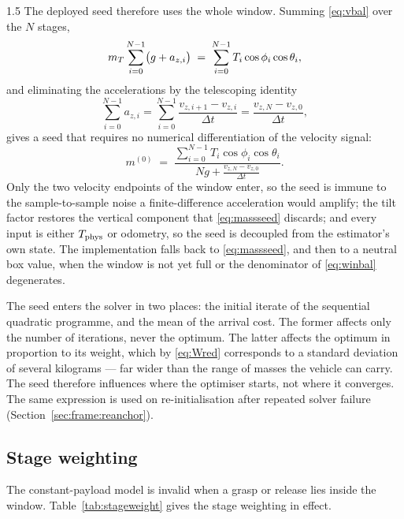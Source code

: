 \begin{spacing}{1.5}
The deployed seed therefore uses the whole window. Summing \eqref{eq:vbal} over
the $N$ stages,
\begin{equation}
m_T \sum_{i=0}^{N-1}\bigl(g + a_{z,i}\bigr) \;=\; \sum_{i=0}^{N-1} T_i \cos\phi_i\cos\theta_i ,
\label{eq:winbal1}
\end{equation}
and eliminating the accelerations by the telescoping identity
\begin{equation}
\sum_{i=0}^{N-1} a_{z,i}
= \sum_{i=0}^{N-1} \frac{v_{z,i+1}-v_{z,i}}{\Delta t}
= \frac{v_{z,N}-v_{z,0}}{\Delta t},
\label{eq:telescope}
\end{equation}
gives a seed that requires no numerical differentiation of the velocity signal:
\begin{equation}
m^{(0)} \;=\; \frac{\displaystyle\sum_{i=0}^{N-1} T_i \cos\phi_i\cos\theta_i}
                   {\displaystyle N g + \frac{v_{z,N}-v_{z,0}}{\Delta t}} .
\label{eq:winbal}
\end{equation}
Only the two velocity endpoints of the window enter, so the seed is immune to the
sample-to-sample noise a finite-difference acceleration would amplify; the tilt
factor restores the vertical component that \eqref{eq:massseed} discards; and
every input is either $T_{\mathrm{phys}}$ or odometry, so the seed is decoupled from the
estimator's own state. The implementation falls back to \eqref{eq:massseed}, and
then to a neutral box value, when the window is not yet full or the denominator
of \eqref{eq:winbal} degenerates.

The seed enters the solver in two places: the initial iterate of the sequential
quadratic programme, and the mean of the arrival cost. The former affects only
the number of iterations, never the optimum. The latter affects the optimum in
proportion to its weight, which by \eqref{eq:Wred} corresponds to a standard
deviation of several kilograms --- far wider than the range of masses the
vehicle can carry. The seed therefore influences where the optimiser starts, not
where it converges. The same expression is used on re-initialisation after
repeated solver failure (Section~\ref{sec:frame:reanchor}).

\subsection{Stage weighting}\label{sec:frame:beta}

The constant-payload model is invalid when a grasp or release lies inside the
window. Table~\ref{tab:stageweight} gives the stage weighting in effect.


\end{spacing}
